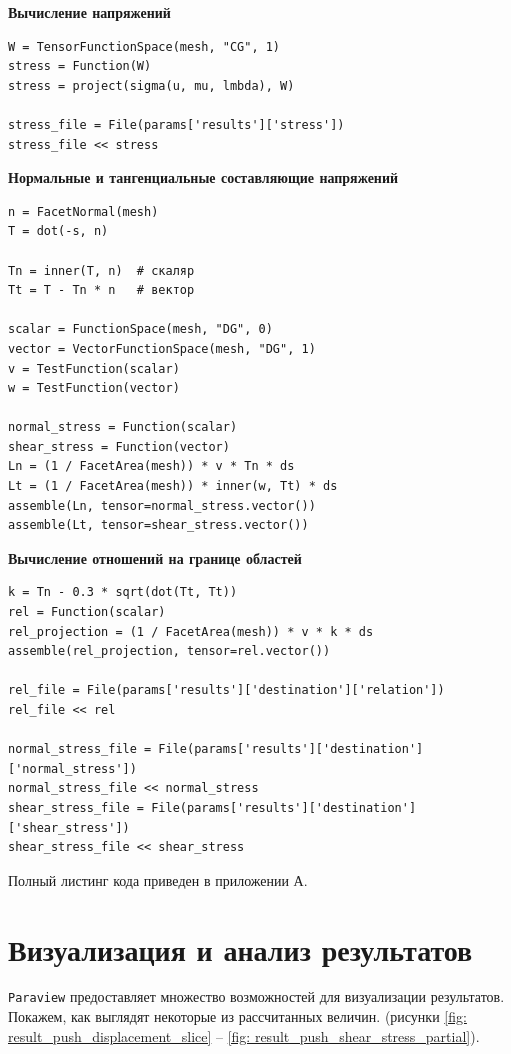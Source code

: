 \documentclass[a4paper, 14pt]{extreport}
\begin{document}
\textbf{Вычисление напряжений}

\begin{lstlisting}
W = TensorFunctionSpace(mesh, "CG", 1)
stress = Function(W)
stress = project(sigma(u, mu, lmbda), W)

stress_file = File(params['results']['stress'])
stress_file << stress
\end{lstlisting}

\textbf{Нормальные и тангенциальные составляющие напряжений}

\begin{lstlisting}
n = FacetNormal(mesh)
T = dot(-s, n)

Tn = inner(T, n)  # скаляр
Tt = T - Tn * n   # вектор

scalar = FunctionSpace(mesh, "DG", 0)
vector = VectorFunctionSpace(mesh, "DG", 1)
v = TestFunction(scalar)
w = TestFunction(vector)

normal_stress = Function(scalar)
shear_stress = Function(vector)
Ln = (1 / FacetArea(mesh)) * v * Tn * ds
Lt = (1 / FacetArea(mesh)) * inner(w, Tt) * ds
assemble(Ln, tensor=normal_stress.vector())
assemble(Lt, tensor=shear_stress.vector())
\end{lstlisting}

\textbf{Вычисление отношений на границе областей}

\begin{lstlisting}
k = Tn - 0.3 * sqrt(dot(Tt, Tt))
rel = Function(scalar)
rel_projection = (1 / FacetArea(mesh)) * v * k * ds
assemble(rel_projection, tensor=rel.vector())

rel_file = File(params['results']['destination']['relation'])
rel_file << rel

normal_stress_file = File(params['results']['destination']['normal_stress'])
normal_stress_file << normal_stress
shear_stress_file = File(params['results']['destination']['shear_stress'])
shear_stress_file << shear_stress
\end{lstlisting}

Полный листинг кода приведен в приложении А.

\section{Визуализация и анализ результатов}

\texttt{Paraview} предоставляет множество возможностей
для визуализации результатов.
Покажем, как выглядят некоторые из рассчитанных величин.
(рисунки \ref{fig: result_push_displacement_slice} -- 
\ref{fig: result_push_shear_stress_partial}).
\end{document}
